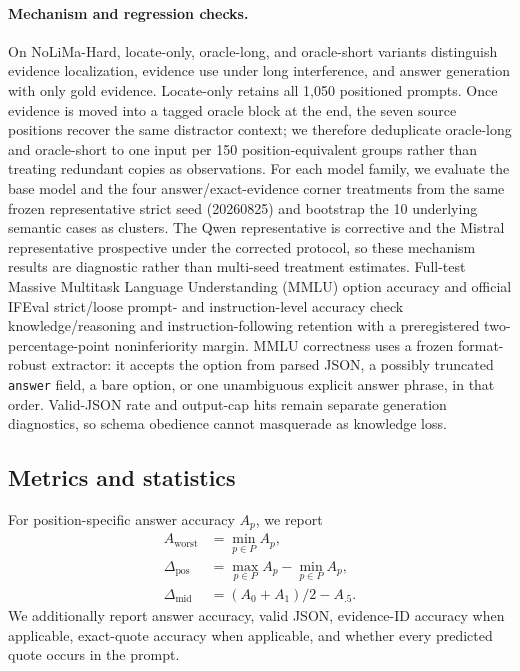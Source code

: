\documentclass[11pt]{article}
\begin{document}
\paragraph{Mechanism and regression checks.}
On NoLiMa-Hard, locate-only, oracle-long, and oracle-short variants distinguish evidence localization, evidence use under long interference, and answer generation with only gold evidence. Locate-only retains all 1,050 positioned prompts. Once evidence is moved into a tagged oracle block at the end, the seven source positions recover the same distractor context; we therefore deduplicate oracle-long and oracle-short to one input per 150 position-equivalent groups rather than treating redundant copies as observations. For each model family, we evaluate the base model and the four answer/exact-evidence corner treatments from the same frozen representative strict seed (20260825) and bootstrap the 10 underlying semantic cases as clusters. The Qwen representative is corrective and the Mistral representative prospective under the corrected protocol, so these mechanism results are diagnostic rather than multi-seed treatment estimates. Full-test Massive Multitask Language Understanding (MMLU) option accuracy \citep{hendrycks2021mmlu} and official IFEval strict/loose prompt- and instruction-level accuracy \citep{zhou2023ifeval} check knowledge/reasoning and instruction-following retention with a preregistered two-percentage-point noninferiority margin. MMLU correctness uses a frozen format-robust extractor: it accepts the option from parsed JSON, a possibly truncated \texttt{answer} field, a bare option, or one unambiguous explicit answer phrase, in that order. Valid-JSON rate and output-cap hits remain separate generation diagnostics, so schema obedience cannot masquerade as knowledge loss.

\subsection{Metrics and statistics}
\label{sec:metrics}

For position-specific answer accuracy $A_p$, we report
\begin{align*}
A_{\mathrm{worst}} &= \min_{p\in P} A_p,\\
\Delta_{\mathrm{pos}} &= \max_{p\in P}A_p-\min_{p\in P}A_p,\\
\Delta_{\mathrm{mid}} &= (A_{0}+A_{1})/2-A_{.5}.
\end{align*}
We additionally report answer accuracy, valid JSON, evidence-ID accuracy when applicable, exact-quote accuracy when applicable, and whether every predicted quote occurs in the prompt.
\end{document}
